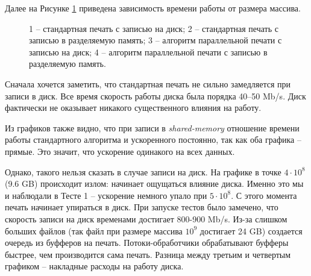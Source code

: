 Далее на Рисунке \ref{grap} приведена зависимость времени работы от размера массива.
\begin{figure}[h!]
\caption{
1 -- стандартная печать с записью на диск;
2 -- стандартная печать с записью в разделяемую память;
3 -- алгоритм параллельной печати с записью на диск;
4 -- алгоритм параллельной печати с записью в разделяемую память.} \label{grap}
\end{figure}

Сначала хочется заметить, что стандартная печать не сильно замедляется при записи в диск. 
Все время скорость работы диска была порядка 40--50 Mb/s.
Диск фактически не оказывает никакого существенного влияния на работу.

Из графиков также видно, что при записи в \textit{shared-memory} отношение времени работы стандартного алгоритма и ускоренного постоянно, так как оба графика -- прямые.
Это значит, что ускорение одинакого на всех данных.

Однако, такого нельзя сказать в случае записи на диск.
На графике в точке $4 \cdot 10^8$ (9.6 GB) происходит излом: начинает ощущаться влияние диска. Именно это мы и наблюдали в Тесте 1 -- ускорение немного упало при $5 \cdot 10^8$.
С этого момента печать начинает упираться в диск.
При запуске тестов было замечено, что скорость записи на диск временами достигает 800-900 Mb/s.
Из-за слишком больших файлов (так файл при размере массива $10^9$ достигает 24 GB) создается очередь из буфферов на печать.
Потоки-обработчики обрабатывают буфферы быстрее, чем производится сама печать.
Разница между третьим и четвертым графиком -- накладные расходы на работу диска.

